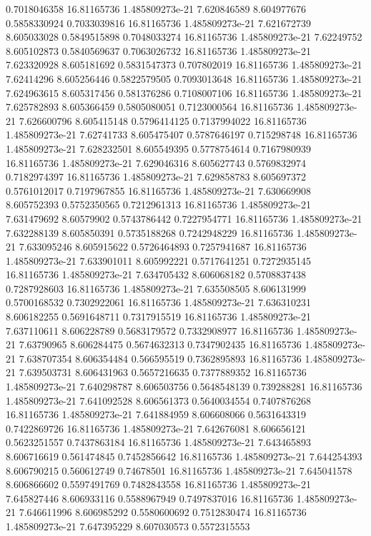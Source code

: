 {0.7018046358 16.81165736 1.485809273e-21 7.620846589 8.604977676 0.5858330924
0.7033039816 16.81165736 1.485809273e-21 7.621672739 8.605033028 0.5849515898
0.7048033274 16.81165736 1.485809273e-21 7.62249752 8.605102873 0.5840569637
0.7063026732 16.81165736 1.485809273e-21 7.623320928 8.605181692 0.5831547373
0.707802019 16.81165736 1.485809273e-21 7.62414296 8.605256446 0.5822579505
0.7093013648 16.81165736 1.485809273e-21 7.624963615 8.605317456 0.581376286
0.7108007106 16.81165736 1.485809273e-21 7.625782893 8.605366459 0.5805080051
0.7123000564 16.81165736 1.485809273e-21 7.626600796 8.605415148 0.5796414125
0.7137994022 16.81165736 1.485809273e-21 7.62741733 8.605475407 0.5787646197
0.715298748 16.81165736 1.485809273e-21 7.628232501 8.605549395 0.5778754614
0.7167980939 16.81165736 1.485809273e-21 7.629046316 8.605627743 0.5769832974
0.7182974397 16.81165736 1.485809273e-21 7.629858783 8.605697372 0.5761012017
0.7197967855 16.81165736 1.485809273e-21 7.630669908 8.605752393 0.5752350565
0.7212961313 16.81165736 1.485809273e-21 7.631479692 8.60579902 0.5743786442
0.7227954771 16.81165736 1.485809273e-21 7.632288139 8.605850391 0.5735188268
0.7242948229 16.81165736 1.485809273e-21 7.633095246 8.605915622 0.5726464893
0.7257941687 16.81165736 1.485809273e-21 7.633901011 8.605992221 0.5717641251
0.7272935145 16.81165736 1.485809273e-21 7.634705432 8.606068182 0.5708837438
0.7287928603 16.81165736 1.485809273e-21 7.635508505 8.606131999 0.5700168532
0.7302922061 16.81165736 1.485809273e-21 7.636310231 8.606182255 0.5691648711
0.7317915519 16.81165736 1.485809273e-21 7.637110611 8.606228789 0.5683179572
0.7332908977 16.81165736 1.485809273e-21 7.63790965 8.606284475 0.5674632313
0.7347902435 16.81165736 1.485809273e-21 7.638707354 8.606354484 0.566595519
0.7362895893 16.81165736 1.485809273e-21 7.639503731 8.606431963 0.5657216635
0.7377889352 16.81165736 1.485809273e-21 7.640298787 8.606503756 0.5648548139
0.739288281 16.81165736 1.485809273e-21 7.641092528 8.606561373 0.5640034554
0.7407876268 16.81165736 1.485809273e-21 7.641884959 8.606608066 0.5631643319
0.7422869726 16.81165736 1.485809273e-21 7.642676081 8.606656121 0.5623251557
0.7437863184 16.81165736 1.485809273e-21 7.643465893 8.606716619 0.561474845
0.7452856642 16.81165736 1.485809273e-21 7.644254393 8.606790215 0.560612749
0.74678501 16.81165736 1.485809273e-21 7.645041578 8.606866602 0.5597491769
0.7482843558 16.81165736 1.485809273e-21 7.645827446 8.606933116 0.5588967949
0.7497837016 16.81165736 1.485809273e-21 7.646611996 8.606985292 0.5580600692
0.7512830474 16.81165736 1.485809273e-21 7.647395229 8.607030573 0.5572315553
}
